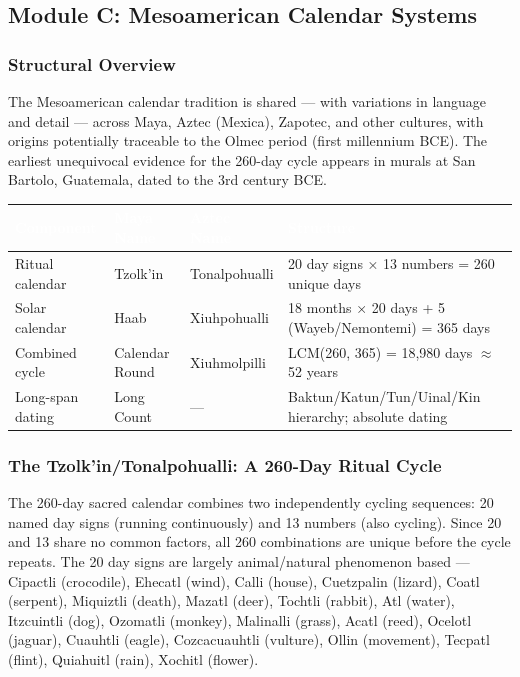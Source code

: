 \documentclass[11pt,letterpaper]{article}
\newcommand{\tableheader}[1]{\textbf{\sffamily\textcolor{white}{#1}}}
\begin{document}
\subsection{Module C: Mesoamerican Calendar Systems}

\subsubsection{Structural Overview}

The Mesoamerican calendar tradition is shared --- with variations in language and detail --- across Maya, Aztec (Mexica), Zapotec, and other cultures, with origins potentially traceable to the Olmec period (first millennium BCE). The earliest unequivocal evidence for the 260-day cycle appears in murals at San Bartolo, Guatemala, dated to the 3rd century BCE.

\begin{center}
\begin{tabularx}{\textwidth}{L{2.5cm}L{2cm}L{2cm}X}
\toprule
{}
\tableheader{Component} & \tableheader{Maya Name} & \tableheader{Aztec Name} & \tableheader{Structure} \\
\midrule
Ritual calendar & Tzolk'in & Tonalpohualli & 20 day signs × 13 numbers = 260 unique days \\
Solar calendar & Haab & Xiuhpohualli & 18 months × 20 days + 5 (Wayeb/Nemontemi) = 365 days \\
Combined cycle & Calendar Round & Xiuhmolpilli & LCM(260, 365) = 18,980 days $\approx$ 52 years \\
Long-span dating & Long Count & --- & Baktun/Katun/Tun/Uinal/Kin hierarchy; absolute dating \\
\bottomrule
\end{tabularx}
\end{center}

\subsubsection{The Tzolk'in/Tonalpohualli: A 260-Day Ritual Cycle}

The 260-day sacred calendar combines two independently cycling sequences: 20 named day signs (running continuously) and 13 numbers (also cycling). Since 20 and 13 share no common factors, all 260 combinations are unique before the cycle repeats. The 20 day signs are largely animal/natural phenomenon based --- Cipactli (crocodile), Ehecatl (wind), Calli (house), Cuetzpalin (lizard), Coatl (serpent), Miquiztli (death), Mazatl (deer), Tochtli (rabbit), Atl (water), Itzcuintli (dog), Ozomatli (monkey), Malinalli (grass), Acatl (reed), Ocelotl (jaguar), Cuauhtli (eagle), Cozcacuauhtli (vulture), Ollin (movement), Tecpatl (flint), Quiahuitl (rain), Xochitl (flower).
\end{document}
